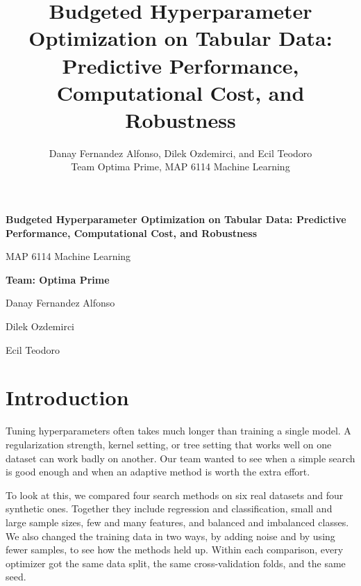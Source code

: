 \documentclass[12pt,letterpaper]{article}
\begin{document}
\thispagestyle{empty}
\begin{center}
\singlespacing
\vspace*{1.1in}
{\LARGE\bfseries Budgeted Hyperparameter Optimization on Tabular Data: Predictive Performance, Computational Cost, and Robustness\par}
\vspace{0.65in}
{\Large MAP 6114 Machine Learning\par}
\vspace{0.45in}
{\large\bfseries Team: Optima Prime\par}
\vspace{0.3in}
{\large Danay Fernandez Alfonso\par}
\vspace{0.1in}
{\large Dilek Ozdemirci\par}
\vspace{0.1in}
{\large Ecil Teodoro\par}
\end{center}
\clearpage
\setcounter{page}{1}
\title{\bfseries\fontsize{18}{22}\selectfont Budgeted Hyperparameter Optimization on Tabular Data: Predictive Performance, Computational Cost, and Robustness}
\author{Danay Fernandez Alfonso, Dilek Ozdemirci, and Ecil Teodoro\\
\normalsize Team Optima Prime, MAP 6114 Machine Learning}
\date{}
\begingroup
\singlespacing
\maketitle
\endgroup

\section{Introduction}\label{introduction}

Tuning hyperparameters often takes much longer than training a single model. A regularization strength, kernel setting, or tree setting that works well on one dataset can work badly on another. Our team wanted to see when a simple search is good enough and when an adaptive method is worth the extra effort.

To look at this, we compared four search methods on six real datasets and four synthetic ones. Together they include regression and classification, small and large sample sizes, few and many features, and balanced and imbalanced classes. We also changed the training data in two ways, by adding noise and by using fewer samples, to see how the methods held up. Within each comparison, every optimizer got the same data split, the same cross-validation folds, and the same seed.
\end{document}
